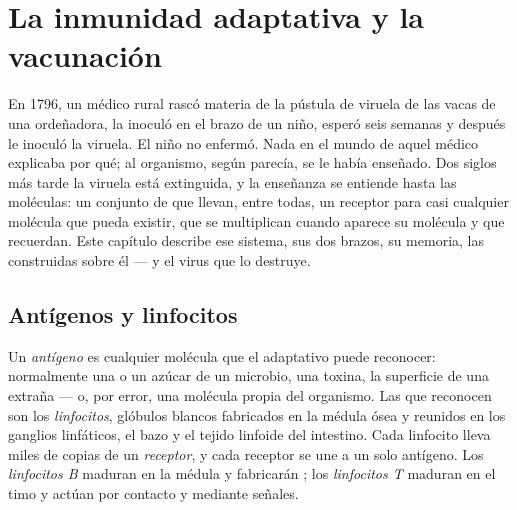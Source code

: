 \chapter{La inmunidad adaptativa y la vacunación}\label{ch:g12:adaptive-immunity}

En 1796, un médico rural rascó materia de la pústula de viruela de las
vacas de una ordeñadora, la inoculó en el brazo de un niño, esperó seis
semanas y después le inoculó la viruela. El niño no enfermó. Nada en el
mundo de aquel médico explicaba por qué; al organismo, según parecía,
se le había enseñado. Dos siglos más tarde la viruela está extinguida,
y la enseñanza se entiende hasta las moléculas: un conjunto de 
que llevan, entre todas, un receptor para casi cualquier molécula que
pueda existir, que se multiplican cuando aparece su molécula y que
recuerdan. Este capítulo describe ese sistema, sus dos brazos, su
memoria, las  construidas sobre él --- y el virus que lo
destruye.

\section{Antígenos y linfocitos}

\begin{definition}\label{def:g12:adaptive-immunity:antigen}
Un \emph{antígeno} es cualquier molécula que el  adaptativo puede reconocer: normalmente una  o un
azúcar de un microbio, una toxina, la superficie de una  extraña
--- o, por error, una molécula propia del organismo. Las  que
reconocen son los \emph{linfocitos}, glóbulos blancos
fabricados en la médula ósea y reunidos en los ganglios linfáticos, el
bazo y el tejido linfoide del intestino. Cada linfocito lleva miles de
copias de un \emph{receptor}, y cada receptor se une a un solo
antígeno. Los \emph{linfocitos B} maduran en la médula y fabricarán
; los \emph{linfocitos T} maduran en el timo y actúan por
contacto y mediante señales.
\end{definition}

